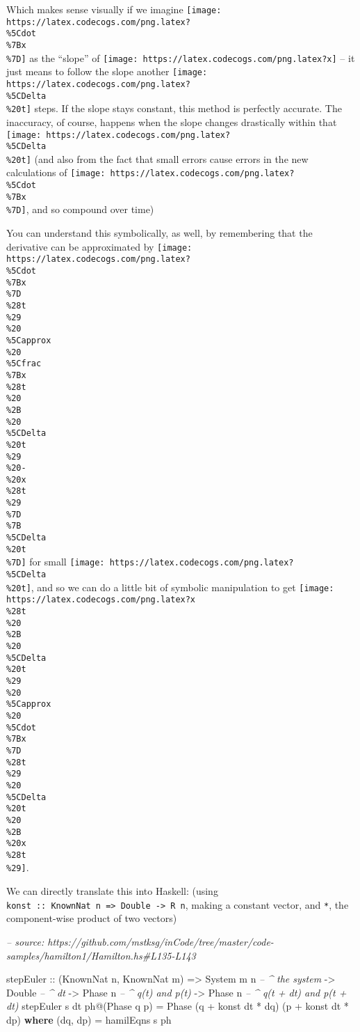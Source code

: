 \documentclass[]{article}
\newenvironment{Shaded}{}{}
\newcommand{\CommentTok}[1]{\textcolor[rgb]{0.38,0.63,0.69}{\textit{#1}}}
\newcommand{\DataTypeTok}[1]{\textcolor[rgb]{0.56,0.13,0.00}{#1}}
\newcommand{\FunctionTok}[1]{\textcolor[rgb]{0.02,0.16,0.49}{#1}}
\newcommand{\KeywordTok}[1]{\textcolor[rgb]{0.00,0.44,0.13}{\textbf{#1}}}
\newcommand{\NormalTok}[1]{#1}
\newcommand{\OtherTok}[1]{\textcolor[rgb]{0.00,0.44,0.13}{#1}}
\begin{document}
Which makes sense visually if we imagine
\texttt{[image: https://latex.codecogs.com/png.latex?\\\%5Cdot\\\%7Bx\\\%7D]} as the
``slope'' of \texttt{[image: https://latex.codecogs.com/png.latex?x]} -- it just
means to follow the slope another
\texttt{[image: https://latex.codecogs.com/png.latex?\\\%5CDelta\\\%20t]} steps. If
the slope stays constant, this method is perfectly accurate. The inaccuracy, of
course, happens when the slope changes drastically within that
\texttt{[image: https://latex.codecogs.com/png.latex?\\\%5CDelta\\\%20t]} (and also
from the fact that small errors cause errors in the new calculations of
\texttt{[image: https://latex.codecogs.com/png.latex?\\\%5Cdot\\\%7Bx\\\%7D]}, and so
compound over time)

You can understand this symbolically, as well, by remembering that the
derivative can be approximated by
\texttt{[image: https://latex.codecogs.com/png.latex?\\\%5Cdot\\\%7Bx\\\%7D\\\%28t\\\%29\\\%20\\\%5Capprox\\\%20\\\%5Cfrac\\\%7Bx\\\%28t\\\%20\\\%2B\\\%20\\\%5CDelta\\\%20t\\\%29\\\%20-\\\%20x\\\%28t\\\%29\\\%7D\\\%7B\\\%5CDelta\\\%20t\\\%7D]}
for small \texttt{[image: https://latex.codecogs.com/png.latex?\\\%5CDelta\\\%20t]},
and so we can do a little bit of symbolic manipulation to get
\texttt{[image: https://latex.codecogs.com/png.latex?x\\\%28t\\\%20\\\%2B\\\%20\\\%5CDelta\\\%20t\\\%29\\\%20\\\%5Capprox\\\%20\\\%5Cdot\\\%7Bx\\\%7D\\\%28t\\\%29\\\%20\\\%5CDelta\\\%20t\\\%20\\\%2B\\\%20x\\\%28t\\\%29]}.

We can directly translate this into Haskell: (using
\texttt{konst\ ::\ KnownNat\ n\ =\textgreater{}\ Double\ -\textgreater{}\ R\ n},
making a constant vector, and \texttt{*}, the component-wise product of two
vectors)

\begin{Shaded}
\begin{Highlighting}[]
\CommentTok{-- source: https://github.com/mstksg/inCode/tree/master/code-samples/hamilton1/Hamilton.hs#L135-L143}

\NormalTok{stepEuler}
\OtherTok{    ::}\NormalTok{ (}\DataTypeTok{KnownNat}\NormalTok{ n, }\DataTypeTok{KnownNat}\NormalTok{ m)}
    \OtherTok{=>} \DataTypeTok{System}\NormalTok{ m n       }\CommentTok{-- ^ the system}
    \OtherTok{->} \DataTypeTok{Double}           \CommentTok{-- ^ dt}
    \OtherTok{->} \DataTypeTok{Phase}\NormalTok{ n          }\CommentTok{-- ^ q(t) and p(t)}
    \OtherTok{->} \DataTypeTok{Phase}\NormalTok{ n          }\CommentTok{-- ^ q(t + dt) and p(t + dt)}
\NormalTok{stepEuler s dt ph}\FunctionTok{@}\NormalTok{(}\DataTypeTok{Phase}\NormalTok{ q p) }\FunctionTok{=} \DataTypeTok{Phase}\NormalTok{ (q }\FunctionTok{+}\NormalTok{ konst dt }\FunctionTok{*}\NormalTok{ dq) (p }\FunctionTok{+}\NormalTok{ konst dt }\FunctionTok{*}\NormalTok{ dp)}
  \KeywordTok{where}
\NormalTok{    (dq, dp) }\FunctionTok{=}\NormalTok{ hamilEqns s ph}
\end{Highlighting}
\end{Shaded}
\end{document}
